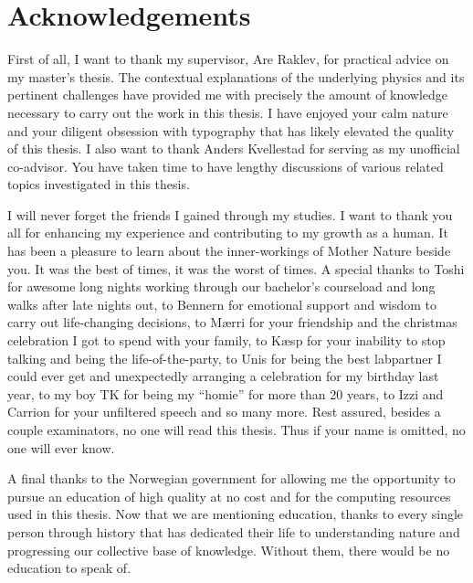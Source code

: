 \chapter*{Acknowledgements}
First of all, I want to thank my supervisor, Are Raklev, for practical advice on my master's thesis. The contextual explanations of the underlying physics and its pertinent challenges have provided me with precisely the amount of knowledge necessary to carry out the work in this thesis. I have enjoyed your calm nature and your diligent obsession with typography that has likely elevated the quality of this thesis. I also want to thank Anders Kvellestad for serving as my unofficial co-advisor. You have taken time to have lengthy discussions of various related topics investigated in this thesis.

I will never forget the friends I gained through my studies. I want to thank you all for enhancing my experience and contributing to my growth as a human. It has been a pleasure to learn about the inner-workings of Mother Nature beside you. It was the best of times, it was the worst of times. A special thanks to Toshi for awesome long nights working through our bachelor's courseload and long walks after late nights out, to Bennern for emotional support and wisdom to carry out life-changing decisions, to Mærri for your friendship and the christmas celebration I got to spend with your family, to Kæsp for your inability to stop talking and being the life-of-the-party, to Unis for being the best labpartner I could ever get and unexpectedly arranging a celebration for my birthday last year, to my boy TK for being my ``homie'' for more than 20 years, to Izzi and Carrion for your unfiltered speech and so many more. Rest assured, besides a couple examinators, no one will read this thesis. Thus if your name is omitted, no one will ever know.

A final thanks to the Norwegian government for allowing me the opportunity to pursue an education of high quality at no cost and for the computing resources used in this thesis. Now that we are mentioning education, thanks to every single person through history that has dedicated their life to understanding nature and progressing our collective base of knowledge. Without them, there would be no education to speak of. 
